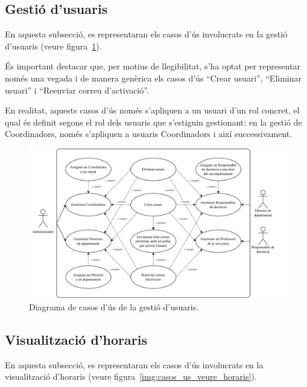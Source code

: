 \documentclass[a4paper,12pt]{ThesisStyle}
\begin{document}
\newpage

\subsection{Gestió d'usuaris}
\label{subsec:casos_us_usuaris}

En aquesta subsecció, es representaran els casos d'ús involucrats en la gestió d'usuaris (veure figura~\ref{img:casos_us_usuaris}).

És important destacar que, per motius de llegibilitat, s'ha optat per representar només una vegada i de manera genèrica els casos d'ús ``Crear usuari'', ``Eliminar usuari'' i ``Reenviar correu d'activació''.

En realitat, aquests casos d'ús només s'apliquen a un usuari d'un rol concret, el qual és definit segons el rol dels usuaris que s'estiguin gestionant: en la gestió de Coordinadors, només s'apliquen a usuaris Coordinadors i així successivament.

\begin{figure}[H]
  \centering
  \includegraphics[width=\textwidth]{assets/use_cases/usuaris.pdf}
  \caption{\label{img:casos_us_usuaris}Diagrama de casos d'ús de la gestió d'usuaris.}
\end{figure}

\newpage

\subsection{Visualització d'horaris}
\label{subsec:casos_us_veure_horaris}

En aquesta subsecció, es representaran els casos d'ús involucrats en la visualització d'horaris (veure figura~\ref{img:casos_us_veure_horaris}).
\end{document}
